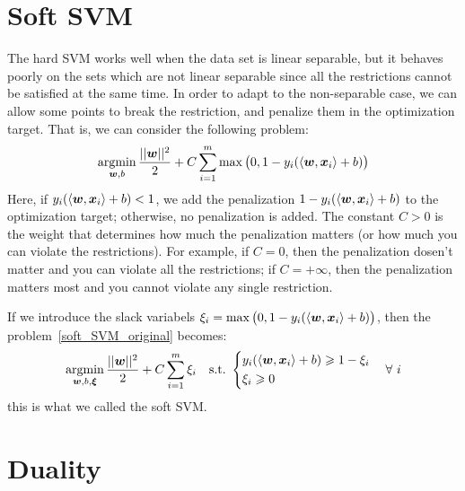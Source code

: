 \section{Soft SVM}
The hard SVM works well when the data set is linear separable, but it behaves poorly on the sets which are not
linear separable since all the restrictions cannot be satisfied at the same time. In order to adapt to the 
non-separable case, we can allow some points to break the restriction, and penalize them in the optimization
target. That is, we can consider the following problem:
\begin{equation}\label{soft_SVM_original}
    \operatorname*{argmin}_{\boldsymbol{w}, b} \frac{||\boldsymbol{w}||^2}{2} + C\sum_{i=1}^{m}\max\big(0, 1 - y_i(\langle\boldsymbol{w}, \boldsymbol{x}_i\rangle
    + b)\big)
\end{equation}
Here, if $y_i(\langle\boldsymbol{w}, \boldsymbol{x}_i\rangle + b) < 1$, we add the penalization 
$1 - y_i(\langle\boldsymbol{w}, \boldsymbol{x}_i\rangle +b)$ to the 
optimization target; otherwise, no penalization is added. The constant $C > 0$ is the weight that determines 
how much the penalization matters (or how much you can violate the restrictions). For example, if $C = 0$, 
then the penalization dosen't matter and you can violate all the restrictions; if $C = +\infty$, then the 
penalization matters most and you cannot violate any single restriction.\par
If we introduce the slack variabels $\xi_i = \max\big(0, 1 - y_i(\langle\boldsymbol{w}, \boldsymbol{x}_i\rangle +b)\big)$, then
the problem~\eqref{soft_SVM_original} becomes:
\begin{equation}\label{soft_SVM}
    \operatorname*{argmin}_{\boldsymbol{w}, b, \boldsymbol{\xi}} \frac{||\boldsymbol{w}||^2}{2} + C\sum_{i=1}^{m}\xi_i\quad\text{s.t.\ }\left\{
    \begin{aligned}
    & y_i(\langle\boldsymbol{w}, \boldsymbol{x}_i\rangle + b) \geqslant 1 - \xi_i\\
    & \xi_i \geqslant 0 
    \end{aligned}\right.
    \quad\forall~i
\end{equation}
this is what we called the soft SVM\@.

\section{Duality}

